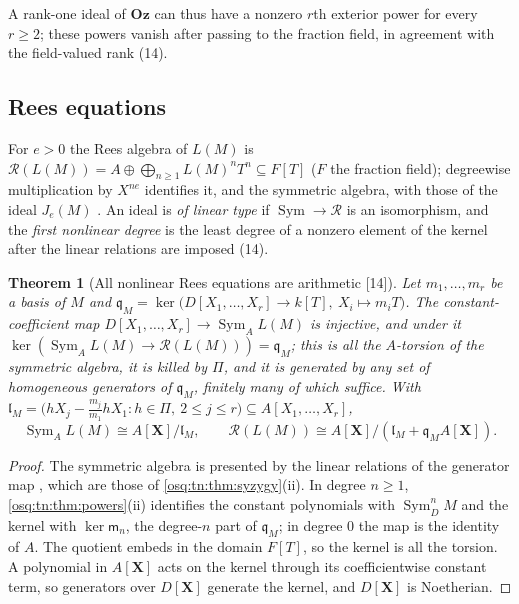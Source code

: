 \documentclass[11pt,letterpaper]{article}
\numberwithin{equation}{section}
\newtheorem{theorem}{Theorem}[section]
\theoremstyle{definition}
\theoremstyle{remark}
\theoremstyle{plain}
\newcommand{\Oz}{\mathbf{Oz}}
\newcommand{\src}[1]{\textup{\textsf{[#1]}}}
\begin{document}
A rank-one ideal of $\Oz$ can thus have a nonzero $r$th exterior power for every $r\ge2$; these powers vanish after passing to the
fraction field, in agreement with the field-valued rank (14).

\subsection{Rees equations}\label{osq:tn:sub:rees}

For $e>0$ the Rees algebra of $L(M)$ is $\mathcal R(L(M))=A\oplus\bigoplus_{n\ge1}L(M)^nT^n\subseteq F[T]$ ($F$ the fraction field);
degreewise multiplication by $X^{ne}$ identifies it, and the symmetric algebra, with those of the ideal $J_e(M)$
\cite[Tag~052P]{StacksRees}. An ideal is \emph{of linear type} if $\operatorname{Sym}\to\mathcal R$ is an isomorphism, and the
\emph{first nonlinear degree} is the least degree of a nonzero element of the kernel after the linear relations are imposed (14).

\begin{theorem}[All nonlinear Rees equations are arithmetic \src{14}]\label{osq:tn:thm:rees}
Let $m_1,\dots,m_r$ be a basis of $M$ and $\mathfrak q_M=\ker\bigl(D[X_1,\dots,X_r]\to k[T],\ X_i\mapsto m_iT\bigr)$. The
constant-coefficient map $D[X_1,\dots,X_r]\to\operatorname{Sym}_AL(M)$ is injective, and under it
$\ker(\operatorname{Sym}_AL(M)\to\mathcal R(L(M)))=\mathfrak q_M$; this is all the $A$-torsion of the symmetric algebra, it is killed
by $\Pi$, and it is generated by any set of homogeneous generators of $\mathfrak q_M$, finitely many of which suffice. With
$\mathfrak l_M=\bigl(hX_j-\tfrac{m_j}{m_1}hX_1:h\in\Pi,\ 2\le j\le r\bigr)\subseteq A[X_1,\dots,X_r]$,
\[
 \operatorname{Sym}_AL(M)\cong A[\mathbf X]/\mathfrak l_M,\qquad
 \mathcal R(L(M))\cong A[\mathbf X]/(\mathfrak l_M+\mathfrak q_MA[\mathbf X]).
\]
\end{theorem}
\begin{proof}
The symmetric algebra is presented by the linear relations of the generator map \cite[Tag~00DM]{StacksTensor}, which are those of
\cref{osq:tn:thm:syzygy}(ii). In degree $n\ge1$, \cref{osq:tn:thm:powers}(ii) identifies the constant polynomials with
$\operatorname{Sym}^n_DM$ and the kernel with $\ker\mathsf m_n$, the degree-$n$ part of $\mathfrak q_M$; in degree $0$ the map is the
identity of $A$. The quotient embeds in the domain $F[T]$, so the kernel is all the torsion. A polynomial in $A[\mathbf X]$ acts on the
kernel through its coefficientwise constant term, so generators over $D[\mathbf X]$ generate the kernel, and $D[\mathbf X]$ is
Noetherian.
\end{proof}
\end{document}
